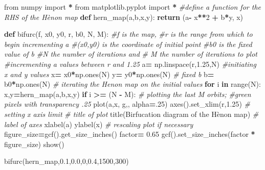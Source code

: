 \documentclass[
  a4paper,
  oneside,
  final]{krantz}
\newenvironment{Shaded}{\begin{snugshade}}{\end{snugshade}}
\newcommand{\BuiltInTok}[1]{#1}
\newcommand{\CommentTok}[1]{\textcolor[rgb]{0.56,0.35,0.01}{\textit{#1}}}
\newcommand{\ControlFlowTok}[1]{\textcolor[rgb]{0.13,0.29,0.53}{\textbf{#1}}}
\newcommand{\DecValTok}[1]{\textcolor[rgb]{0.00,0.00,0.81}{#1}}
\newcommand{\FloatTok}[1]{\textcolor[rgb]{0.00,0.00,0.81}{#1}}
\newcommand{\ImportTok}[1]{#1}
\newcommand{\KeywordTok}[1]{\textcolor[rgb]{0.13,0.29,0.53}{\textbf{#1}}}
\newcommand{\NormalTok}[1]{#1}
\newcommand{\OperatorTok}[1]{\textcolor[rgb]{0.81,0.36,0.00}{\textbf{#1}}}
\newcommand{\StringTok}[1]{\textcolor[rgb]{0.31,0.60,0.02}{#1}}
\theoremstyle{definition}
\theoremstyle{definition}
\theoremstyle{definition}
\theoremstyle{definition}
\theoremstyle{remark}
\begin{document}
\begin{Shaded}
\begin{Highlighting}[]

\ImportTok{from}\NormalTok{ numpy }\ImportTok{import} \OperatorTok{*}
\ImportTok{from}\NormalTok{ matplotlib.pyplot }\ImportTok{import} \OperatorTok{*}
\CommentTok{\#define a function for the RHS of the Hènon map}
\KeywordTok{def}\NormalTok{ hern\_map(a,b,x,y):}
        \ControlFlowTok{return}\NormalTok{ (a}\OperatorTok{{-}}\NormalTok{ x}\OperatorTok{**}\DecValTok{2} \OperatorTok{+}\NormalTok{ b}\OperatorTok{*}\NormalTok{y, x) }

\KeywordTok{def}\NormalTok{ bifurc(f, x0, y0, r, b0, N, M):}
  \CommentTok{\#f is the map,}
  \CommentTok{\#r is the range from which to begin incrementing a}
  \CommentTok{\#(x0,y0) is the coordinate of initial point}
  \CommentTok{\#b0 is the fixed value of b }
  \CommentTok{\#N the number of iterations and}
  \CommentTok{\# M the number of iterations to plot}
    \CommentTok{\#incrementing a values between r and 1.25}
\NormalTok{    a}\OperatorTok{=}\NormalTok{ np.linspace(r,}\FloatTok{1.25}\NormalTok{,N) }
    \CommentTok{\#initiating x and y values}
\NormalTok{    x}\OperatorTok{=}\NormalTok{ x0}\OperatorTok{*}\NormalTok{np.ones(N) }
\NormalTok{    y}\OperatorTok{=}\NormalTok{ y0}\OperatorTok{*}\NormalTok{np.ones(N) }
    \CommentTok{\# fixed b }
\NormalTok{    b}\OperatorTok{=}\NormalTok{ b0}\OperatorTok{*}\NormalTok{np.ones(N)}
    \CommentTok{\# iterating the Henon map on the initial values  }
    \ControlFlowTok{for}\NormalTok{ i }\KeywordTok{in} \BuiltInTok{range}\NormalTok{(N):  }
\NormalTok{      x,y}\OperatorTok{=}\NormalTok{hern\_map(a,b,x,y)}
      \ControlFlowTok{if}\NormalTok{ i }\OperatorTok{\textgreater{}=}\NormalTok{ (N }\OperatorTok{{-}}\NormalTok{ M):}
        \CommentTok{\# plotting the last M orbits; }
        \CommentTok{\#green pixels with transparency .25}
\NormalTok{        plot(a,x, }\StringTok{\textquotesingle{}g,\textquotesingle{}}\NormalTok{, alpha}\OperatorTok{=}\FloatTok{.25}\NormalTok{) }
\NormalTok{    axes().set\_xlim(r,}\FloatTok{1.25}\NormalTok{) }\CommentTok{\# setting x axis limit }
    \CommentTok{\# title of plot }
\NormalTok{    title(}\StringTok{\textquotesingle{}Birfucation diagram of the Hènon map\textquotesingle{}}\NormalTok{)}
    \CommentTok{\# label of axes  }
\NormalTok{    xlabel(}\StringTok{\textquotesingle{}a\textquotesingle{}}\NormalTok{)                                }
\NormalTok{    ylabel(}\StringTok{\textquotesingle{}x\textquotesingle{}}\NormalTok{)}
    \CommentTok{\# rescaling plot if necessary                                }
\NormalTok{    figure\_size}\OperatorTok{=}\NormalTok{gcf().get\_size\_inches() }
\NormalTok{    factor}\OperatorTok{=} \FloatTok{0.65}
\NormalTok{    gcf().set\_size\_inches(factor }\OperatorTok{*}\NormalTok{ figure\_size)}
\NormalTok{    show()}

\NormalTok{bifurc(hern\_map,}\FloatTok{0.1}\NormalTok{,}\FloatTok{0.0}\NormalTok{,}\DecValTok{0}\NormalTok{,}\FloatTok{0.4}\NormalTok{,}\DecValTok{1500}\NormalTok{,}\DecValTok{300}\NormalTok{)}
\end{Highlighting}
\end{Shaded}
\end{document}
